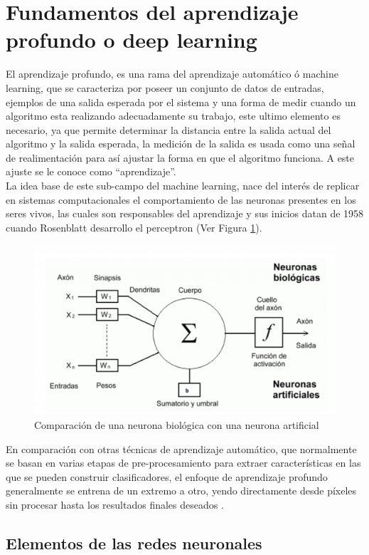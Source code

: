 \section{Fundamentos del aprendizaje profundo o deep learning}
El aprendizaje profundo, es una rama del aprendizaje automático ó machine learning, que se caracteriza por poseer un conjunto de datos de entradas, ejemplos de una salida esperada por el sistema y una forma de medir cuando un algoritmo esta realizando adecuadamente su trabajo, este ultimo elemento es necesario, ya que permite determinar la distancia entre la salida actual del algoritmo y la salida esperada, la medición de la salida es usada como una señal de realimentación para así ajustar la forma en que el algoritmo funciona. A este ajuste se le conoce como ``aprendizaje''.
\\
La idea base de este sub-campo del machine learning, nace del interés de replicar en sistemas computacionales el comportamiento de las neuronas presentes en los seres vivos, las cuales son responsables del aprendizaje y sus inicios datan de  1958 cuando Rosenblatt desarrollo el perceptron (Ver Figura \ref{perceptron}).
\begin{figure}[H]
    \centering
    \includegraphics[scale=0.35]{Recursos/perceptron.png}
    \caption{Comparación de una neurona biológica con una neurona artificial}
    \label{perceptron}
\end{figure}
En comparación con otras técnicas de aprendizaje automático, que normalmente se basan en varias
etapas de pre-procesamiento para extraer características en las que se pueden construir clasificadores, el enfoque de aprendizaje profundo
generalmente se entrena de un extremo a otro, yendo directamente desde píxeles sin procesar hasta los resultados finales deseados \cite{Szeliski2020}.
\subsection{Elementos de las redes neuronales}
